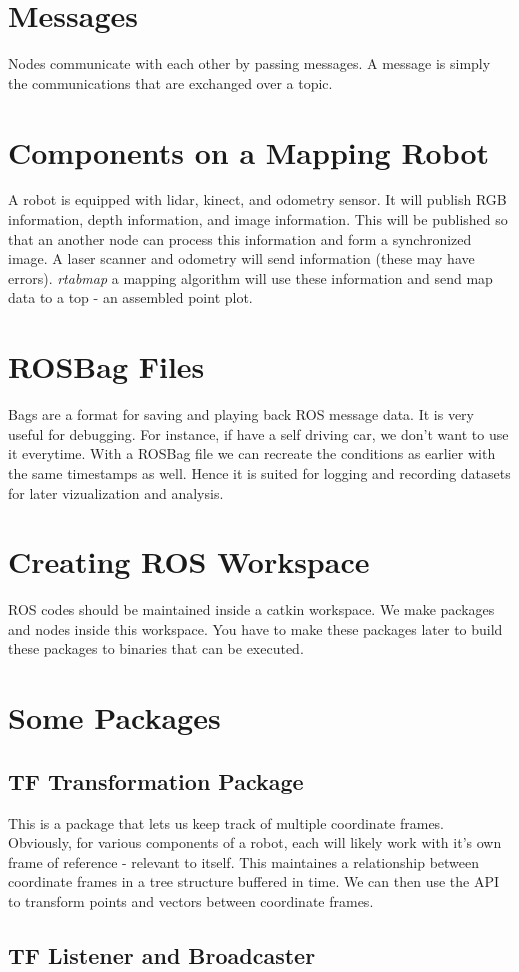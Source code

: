 \section*{Messages}

Nodes communicate with each other by passing messages. A message is simply the communications that are exchanged over a topic.

\section*{Components on a Mapping Robot}

A robot is equipped with lidar, kinect, and odometry sensor. It will publish RGB information, depth information, and image information. This will be published so that an another node can process this information and form a synchronized image. A laser scanner and odometry will send information (these may have errors). \textit{rtabmap} a mapping algorithm will use these information and send map data to a top - an assembled point plot.

\section*{ROSBag Files}

Bags are a format for saving and playing back ROS message data. It is very useful for debugging. For instance, if have a self driving car, we don't want to use it everytime. With a ROSBag file we can recreate the conditions as earlier with the same timestamps as well. Hence it is suited for logging and recording datasets for later vizualization and analysis.

\section*{Creating ROS Workspace}

ROS codes should be maintained inside a catkin workspace. We make packages and nodes inside this workspace. You have to make these packages later to build these packages to binaries that can be executed.

\section*{Some Packages}

\subsection*{TF Transformation Package}

This is a package that lets us keep track of multiple coordinate frames. Obviously, for various components of a robot, each will likely work with it's own frame of reference - relevant to itself. This maintaines a relationship between coordinate frames in a tree structure buffered in time. We can then use the API to transform points and vectors between coordinate frames.

\subsection*{TF Listener and Broadcaster}

